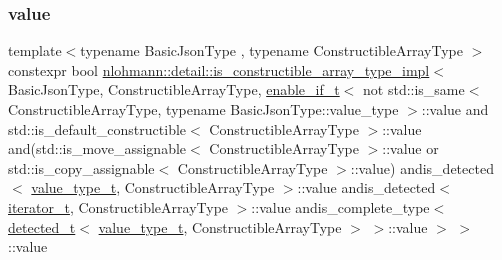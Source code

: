 \subsubsection{\texorpdfstring{value}{value}}
{\footnotesize\ttfamily template$<$typename Basic\+Json\+Type , typename Constructible\+Array\+Type $>$ \\
constexpr bool \mbox{\hyperlink{structnlohmann_1_1detail_1_1is__constructible__array__type__impl}{nlohmann\+::detail\+::is\+\_\+constructible\+\_\+array\+\_\+type\+\_\+impl}}$<$ Basic\+Json\+Type, Constructible\+Array\+Type, \mbox{\hyperlink{namespacenlohmann_1_1detail_a02bcbc878bee413f25b985ada771aa9c}{enable\+\_\+if\+\_\+t}}$<$ not std\+::is\+\_\+same$<$ Constructible\+Array\+Type, typename Basic\+Json\+Type\+::value\+\_\+type $>$\+::value and std\+::is\+\_\+default\+\_\+constructible$<$ Constructible\+Array\+Type $>$\+::value and(std\+::is\+\_\+move\+\_\+assignable$<$ Constructible\+Array\+Type $>$\+::value or std\+::is\+\_\+copy\+\_\+assignable$<$ Constructible\+Array\+Type $>$\+::value) andis\+\_\+detected$<$ \mbox{\hyperlink{namespacenlohmann_1_1detail_af91beae90c2fb0f931079b3d50a343bc}{value\+\_\+type\+\_\+t}}, Constructible\+Array\+Type $>$\+::value andis\+\_\+detected$<$ \mbox{\hyperlink{namespacenlohmann_1_1detail_a9ff93db146174305bce1bc4c54703e11}{iterator\+\_\+t}}, Constructible\+Array\+Type $>$\+::value andis\+\_\+complete\+\_\+type$<$ \mbox{\hyperlink{namespacenlohmann_1_1detail_a37e97a32d0b94ce5f745427e4e40204d}{detected\+\_\+t}}$<$ \mbox{\hyperlink{namespacenlohmann_1_1detail_af91beae90c2fb0f931079b3d50a343bc}{value\+\_\+type\+\_\+t}}, Constructible\+Array\+Type $>$ $>$\+::value $>$ $>$\+::value\hspace{0.3cm}{\ttfamily [static]}}

